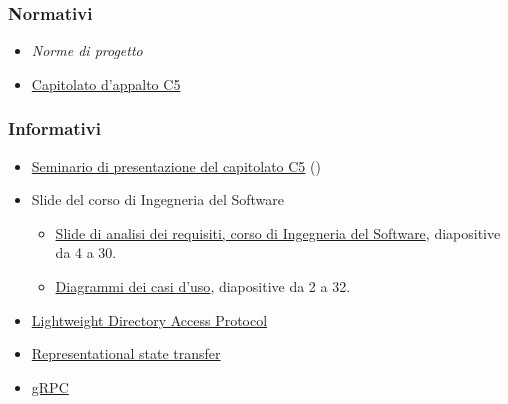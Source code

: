 \documentclass[../analisi-dei-requisiti.tex]{subfiles}
\begin{document}
\subsubsection{Normativi}%
\label{par:normativi}
\begin{itemize}
  \item \textit{Norme di progetto}
  \item \href{https://www.math.unipd.it/~tullio/IS-1/2019/Progetto/C5.pdf}{Capitolato d'appalto C5}
\end{itemize}

\subsubsection{Informativi}%
\label{par:informativi}
\begin{itemize}
  \item \href{https://www.math.unipd.it/~tullio/IS-1/2019/Dispense/C5a.pdf}{Seminario di presentazione del capitolato C5} ()
  \item Slide del corso di Ingegneria del Software
        \begin{itemize}
          \item \href{https://www.math.unipd.it/~tullio/IS-1/2019/Dispense/L08.pdf}{Slide di analisi dei requisiti, corso di Ingegneria del Software}, diapositive da 4 a 30.
          \item \href{https://www.math.unipd.it/~tullio/IS-1/2019/Dispense/E03.pdf}{Diagrammi dei casi d'uso}, diapositive da 2 a 32.
        \end{itemize}
  \item \href{https://www.openldap.org/}{Lightweight Directory Access Protocol}
  \item \href{https://www.ics.uci.edu/~fielding/pubs/dissertation/rest_arch_style.htm}{Representational state transfer}
  \item \href{https://grpc.io/docs/guides/}{gRPC}
\end{itemize}
\end{document}
